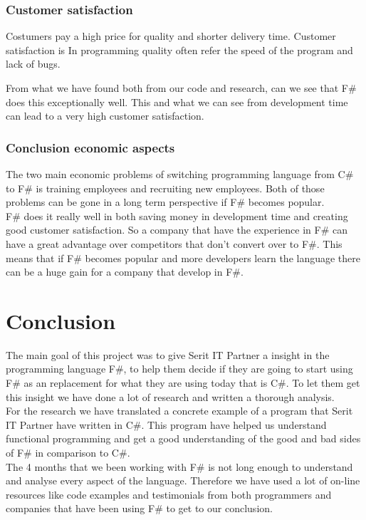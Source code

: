 \documentclass[12pt, a4paper]{article}
\begin{document}
\newpage
\subsubsection{Customer satisfaction}
Costumers pay a high price for quality and shorter delivery time. Customer satisfaction is In programming quality often refer the speed of the program and lack of bugs. 


From what we have found both from our code and research, can we see that F\# does this exceptionally well. This and what we can see from development time can lead to a very high customer satisfaction.

\newpage
\subsubsection{Conclusion economic aspects}
The two main economic problems of switching programming language from C\# to F\# is training employees and recruiting new employees. Both of those problems can be gone in a long term perspective if F\# becomes popular.\\

F\# does it really well in both saving money in development time and creating good customer satisfaction.  So a company that have the experience in F\# can have a great advantage over competitors that don't convert over to F\#. This means that if F\# becomes popular and more developers learn the language there can be a huge gain for a company that develop in F\#. 

\newpage

\section{Conclusion}
The main goal of this project was to give Serit IT Partner a insight in the programming language F\#, to help them decide if they are going to start using F\# as an replacement for what they are using today that is C\#. To let them get this insight we have done a lot of research and written a thorough analysis.\\

For the research we have translated a concrete example of a program that Serit IT Partner have written in C\#. This program have helped us understand functional programming and get a good understanding of the good and bad sides of F\# in comparison to C\#.\\

The 4 months that we been working with F\# is not long enough to understand and analyse every aspect of the language. Therefore we have used a lot of on-line resources like code examples and testimonials from both programmers and companies that have been using F\# to get to our conclusion.\\
\end{document}
